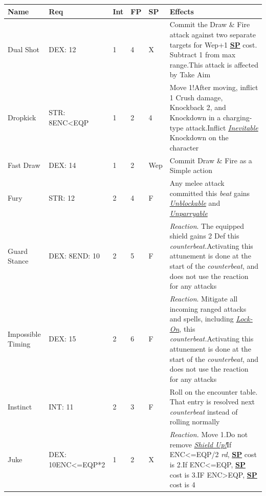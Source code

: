 \documentclass[12pt]{article}
\newcommand{\refto}[1]{\hyperlink{#1}{\textbf{#1}}}
\newcommand{\reftoit}[1]{\hyperlink{#1}{\emph{#1}}}
\begin{document}
\begin{center}
\begin{tabularx}{\textwidth}{p{}p{}p{}p{}p{}p{}}
\hline
\rowcolor{white} \textbf{Name} & \textbf{Req} & \textbf{Int} & \textbf{FP} & \textbf{SP} & \textbf{Effects}\setcounter{rownum}{0}\\
\hline
Dual Shot & DEX: 12 & 1 & 4 & X & Commit the Draw \& Fire attack against two separate targets for Wep+1 \refto{SP} cost. Subtract 1 from max range.\newline This attack is affected by Take Aim\\
Dropkick & STR: 8\newline ENC<EQP & 1 & 2 & 4 & Move 1!\newline After moving, inflict 1 Crush damage, Knockback 2, and Knockdown in a charging-type attack.\newline Inflict \reftoit{Inevitable} Knockdown on the character\\
Fast Draw & DEX: 14 & 1 & 2 & Wep & Commit Draw \& Fire as a Simple action \\
Fury & STR: 12 & 2 & 4 & F & Any melee attack committed this \emph{beat} gains \reftoit{Unblockable} and \reftoit{Unparryable}\\
Guard Stance & DEX: 8\newline END: 10 & 2 & 5 & F & \emph{Reaction}. The equipped shield gains 2 Def this \emph{counterbeat}.\newline Activating this attunement is done at the start of the \emph{counterbeat}, and does not use the reaction for any attacks\\
Impossible Timing & DEX: 15 & 2 & 6 & F & \emph{Reaction}. Mitigate all incoming ranged attacks and spells, including \reftoit{Lock-On}, this \emph{counterbeat.}\newline Activating this attunement is done at the start of the \emph{counterbeat}, and does not use the reaction for any attacks\\
Instinct & INT: 11 & 2 & 3 & F & Roll on the encounter table. That entry is resolved next \emph{counterbeat} instead of rolling normally \\
Juke & DEX: 10\newline ENC<=EQP*2 & 1 & 2 & X & \emph{Reaction.} Move 1.\newline Do not remove \reftoit{Shield Up!}\newline If ENC<=EQP/2 \emph{rd}, \refto{SP} cost is 2.\newline If ENC<=EQP, \refto{SP} cost is 3.\newline IF ENC>EQP, \refto{SP} cost is 4 \\

\end{tabularx}
\end{center}
\end{document}

